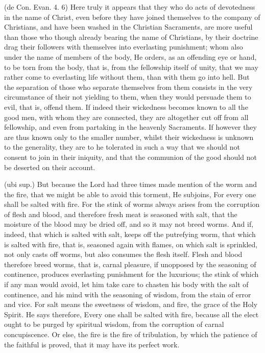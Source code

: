  (de Con. Evan. 4. 6) Here truly it appears that they who do acts of devotedness in the name of Christ, even before they have joined themselves to the company of Christians, and have been washed in the Christian Sacraments, are more useful than those who though already bearing the name of Christians, by their doctrine drag their followers with themselves into everlasting punishment; whom also under the name of members of the body, He orders, as an offending eye or hand, to be torn from the body, that is, from the fellowship itself of unity, that we may rather come to everlasting life without them, than with them go into hell. But the separation of those who separate themselves from them consists in the very circumstance of their not yielding to them, when they would persuade them to evil, that is, offend them. If indeed their wickedness becomes known to all the good men, with whom they are connected, they are altogether cut off from all fellowship, and even from partaking in the heavenly Sacraments. If however they are thus known only to the smaller number, whilst their wickedness is unknown to the generality, they are to he tolerated in such a way that we should not consent to join in their iniquity, and that the communion of the good should not be deserted on their account.

 (ubi sup.) But because the Lord had three times made mention of the worm and the fire, that we might be able to avoid this torment, He subjoins, For every one shall be salted with fire. For the stink of worms always arises from the corruption of flesh and blood, and therefore fresh meat is seasoned with salt, that the moisture of the blood may be dried off, and so it may not breed worms. And if, indeed, that which is salted with salt, keeps off the putrefying worm, that which is salted with fire, that is, seasoned again with flames, on which salt is sprinkled, not only casts off worms, but also consumes the flesh itself. Flesh and blood therefore breed worms, that is, carnal pleasure, if unopposed by the seasoning of continence, produces everlasting punishment for the luxurious; the stink of which if any man would avoid, let him take care to chasten his body with the salt of continence, and his mind with the seasoning of wisdom, from the stain of error and vice. For salt means the sweetness of wisdom, and fire, the grace of the Holy Spirit. He says therefore, Every one shall be salted with fire, because all the elect ought to be purged by spiritual wisdom, from the corruption of carnal concupiscence. Or else, the fire is the fire of tribulation, by which the patience of the faithful is proved, that it may have its perfect work.

